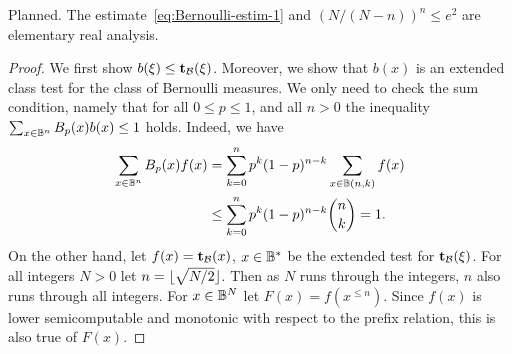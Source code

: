\begin{formalization}
Planned. The estimate~\eqref{eq:Bernoulli-estim-1} and $(N/(N-n))^{n}\le e^{2}$ are elementary real analysis.
\end{formalization}
 \begin{proof}
We first show \( b(\xi)\le \mathbf{t}_{\mathcal{B}}(\xi) \).
Moreover, we show that \( b(x) \) is an extended
class test for the class of Bernoulli measures.
We only need to check the sum condition, namely that for all
\( 0\le p \le 1 \), and all \( n>0 \) the inequality
\( \sum_{x\in\mathbb{B}^{n}}B_{p}(x)b(x) \le 1 \) holds.
Indeed, we have
 \begin{align*}
 \sum_{x\in\mathbb{B}^{n}}B_{p}(x)f(x)
     &= \sum_{k=0}^{n}p^{k}(1-p)^{n-k}\sum_{x\in\mathbb{B}(n,k)}f(x)
\\  &\le \sum_{k=0}^{n}p^{k}(1-p)^{n-k}\binom{n}{k} = 1.
 \end{align*}
On the other hand, let \( f(x)=\mathbf{t}_{\mathcal{B}}(x) \), \( x\in\mathbb{B}^{*} \)
be the extended test for \( \mathbf{t}_{\mathcal{B}}(\xi) \).
For all integers \( N>0 \) let \( n = {\lfloor \sqrt{N/2}\rfloor} \).
Then as \( N \) runs through the integers, \( n \) also runs through all integers.
For \( x\in\mathbb{B}^{N} \) let \( F(x)=f(x^{\le n}) \).
Since \( f(x) \) is lower semicomputable and monotonic with respect to the prefix
relation, this is also true of \( F(x) \).


\end{proof}
